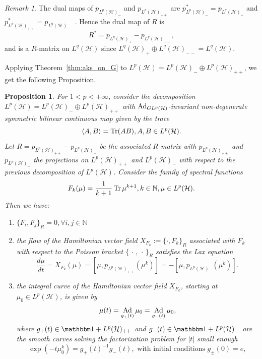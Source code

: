 \documentclass[a4paper,12pt,reqno]{amsart}%
\newtheorem{proposition}[theorem]{Proposition}
\theoremstyle{definition}
\theoremstyle{remark}
\newtheorem{remark}[theorem]{Remark}
\numberwithin{theorem}{section}
\numberwithin{equation}{section}
\newcommand{\1}{{\bf 1}}
\newcommand{\pb}{\{\,\cdot\,,\,\cdot\,\}}
\newcommand{\Id}{\mathbbm 1}
\DeclareMathOperator{\Ad}{\textnormal{Ad}}
\DeclareMathOperator{\Tr}{\textnormal{Tr}}
\begin{document}
\begin{remark}
The dual maps of $p_{L^p(\mathcal{H})_{-}}$ and $p_{L^p(\mathcal{H})_{++}}$ are
$p_{L^p(\mathcal{H})_{-}}^* = p_{L^{q}(\mathcal{H})_{+}}$ and  $p_{L^p(\mathcal{H})_{++}}^* = p_{L^{q}(\mathcal{H})_{--} }$. 
Hence the dual map of $R$ is 
\[
R^* = p_{L^{q}(\mathcal{H})_{+}} - p_{L^{q}(\mathcal{H})_{--} },
\]
and is a $R$-matrix on $L^{q}(\mathcal{H})$ since $L^{q}(\mathcal{H})_{+}\oplus L^{q}(\mathcal{H})_{--} = L^{q}(\mathcal{H})$.
\end{remark}


Applying Theorem~\ref{thm:aks_on_G} to $L^p(\mathcal{H}) = L^p(\mathcal{H})_{-}\oplus L^p(\mathcal{H})_{++}$, we get the following Proposition.
\begin{proposition}
    For $1<p<+\infty$, consider the decomposition  $L^p(\mathcal{H}) = L^p(\mathcal{H})_{-}\oplus L^p(\mathcal{H})_{++}$ with $\Ad_{GL^p(\mathcal H)}$-invariant non-degenerate symmetric bilinear continuous map given by the trace
    \begin{equation}
        \langle A, B\rangle = \Tr (AB), A, B \in L^p(\mathcal{H}).
    \end{equation}
    Let $R = p_{L^p(\mathcal{H})_{++}} - p_{L^p(\mathcal{H})_{-}}$ be the associated $R$-matrix with $p_{L^p(\mathcal{H})_{++}}$ and $p_{L^p(\mathcal{H})_{-}}$ the projections on $L^p(\mathcal{H})_{++}$ and $L^p(\mathcal{H})_{-}$ with respect to the previous decomposition of $L^p(\mathcal{H})$. 
    Consider the family of spectral functions 
    \begin{equation}
    F_k(\mu) = \frac{1}{k+1}\Tr \mu^{k+1}, k\in\mathbb{N}, \mu \in L^p(\mathcal H).
    \end{equation}
    Then we have:
    \begin{enumerate}
        \item $\{F_{i}, F_j\}_R = 0, \forall i,j \in\mathbb{N}$
        \item the flow of the Hamiltonian vector field $X_{F_k}:= \{\cdot, F_k\}_R$ associated with $F_k$ with respect to the Poisson bracket $\pb_R$ satisfies the Lax equation
        \begin{equation}
            \frac{d\mu}{dt} = X_{F_k}(\mu) =   \left[\mu, p_{L^p(\mathcal{H})_{++}}(\mu^{k})\right] = -\left[\mu, p_{L^p(\mathcal{H})_{-}}(\mu^{k})\right].
        \end{equation}
        \item the integral curve of the Hamiltonian vector field $X_{F_k}$, starting at $\mu_0\in L^p(\mathcal{H})$, is given by
    \[
    \mu(t) = \Ad_{g_+(t)}\mu_0 = \Ad_{g_-(t)}\mu_0,
    \]
    where $g_+(t)\in \Id + L^p(\mathcal{H})_{++}$ and $g_-(t) \in \Id + L^p(\mathcal{H})_{-}$ are the smooth curves solving the factorization problem for $|t|$ small enough
    \begin{equation}
    \exp(-t  \mu_0^{k}) = g_+(t)^{-1} g_-(t), \textrm{  with initial conditions } g_\pm(0) = e,
    \end{equation}
    \end{enumerate}
\end{proposition}
\end{document}
